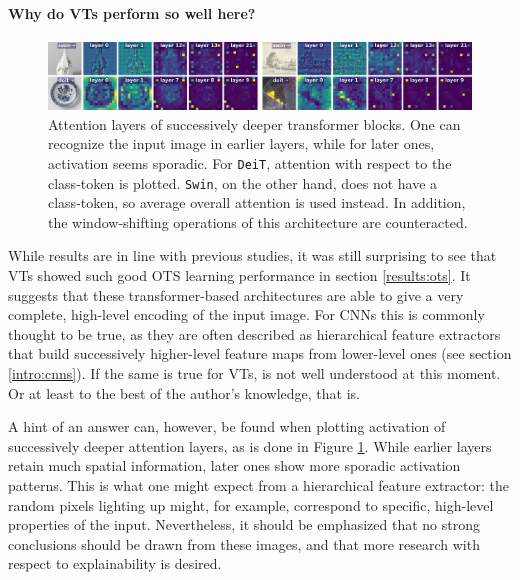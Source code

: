 \paragraph{Why do VTs perform so well here?}

\begin{figure}[tb]
    \includegraphics[width=\textwidth]{img/layers.png}
    \caption{Attention layers of successively deeper transformer blocks. One can recognize the input image in earlier layers, while for later ones, activation seems sporadic. For \texttt{DeiT}, attention with respect to the class-token is plotted. \texttt{Swin}, on the other hand, does not have a class-token, so average overall attention is used instead. In addition, the window-shifting operations of this architecture are counteracted.}
    \label{results:img:layers}
\end{figure}

While results are in line with previous studies, it was still surprising to see that VTs showed such good OTS learning performance in section \ref{results:ots}. It suggests that these transformer-based architectures are able to give a very complete, high-level encoding of the input image. For CNNs this is commonly thought to be true, as they are often described as hierarchical feature extractors that build successively higher-level feature maps from lower-level ones (see section \ref{intro:cnns}). If the same is true for VTs, is not well understood at this moment. Or at least to the best of the author's knowledge, that is.

A hint of an answer can, however, be found when plotting activation of successively deeper attention layers, as is done in Figure \ref{results:img:layers}. While earlier layers retain much spatial information, later ones show more sporadic activation patterns. This is what one might expect from a hierarchical feature extractor: the random pixels lighting up might, for example, correspond to specific, high-level properties of the input. Nevertheless, it should be emphasized that no strong conclusions should be drawn from these images, and that more research with respect to explainability is desired.

